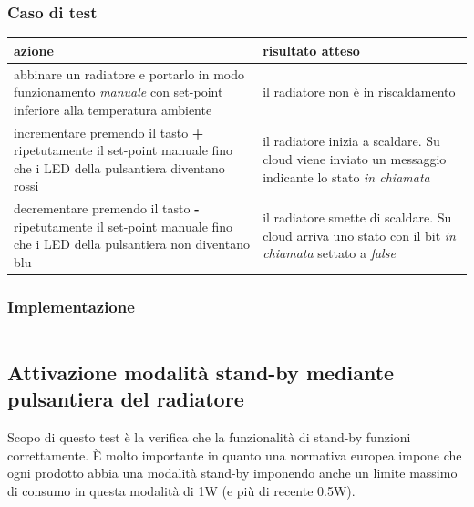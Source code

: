 \documentclass[12pt,a4paper,twoside,titlepage]{book}
\begin{document}
\subsubsection{Caso di test}
\begin{center}
\begin{tabular}{| p{} | p{} |}
    \hline
    \textbf{azione} & \textbf{risultato atteso} \\ \hline
    abbinare un radiatore e portarlo in modo funzionamento \textit{manuale} con set-point inferiore alla temperatura ambiente & il radiatore non è in riscaldamento \\ \hline
    incrementare premendo il tasto \textbf{+} ripetutamente il set-point manuale fino che i LED della pulsantiera diventano rossi & il radiatore inizia a scaldare. Su cloud viene inviato un messaggio indicante lo stato \textit{in chiamata} \\ \hline 
    decrementare premendo il tasto \textbf{-} ripetutamente il set-point manuale fino che i LED della pulsantiera non diventano blu & il radiatore smette di scaldare. Su cloud arriva uno stato con il bit \textit{in chiamata} settato a \textit{false} \\ \hline
\end{tabular}
\end{center}

\subsubsection{Implementazione}
\inputminted{python3}{src/test_thermoregulation.py}

\subsection{Attivazione modalità stand-by mediante pulsantiera del radiatore}

Scopo di questo test è la verifica che la funzionalità di stand-by funzioni correttamente.
È molto importante in quanto una normativa europea impone che ogni prodotto abbia una
modalità stand-by imponendo anche un limite massimo di consumo in questa modalità di 1W
(e più di recente 0.5W).
\end{document}
